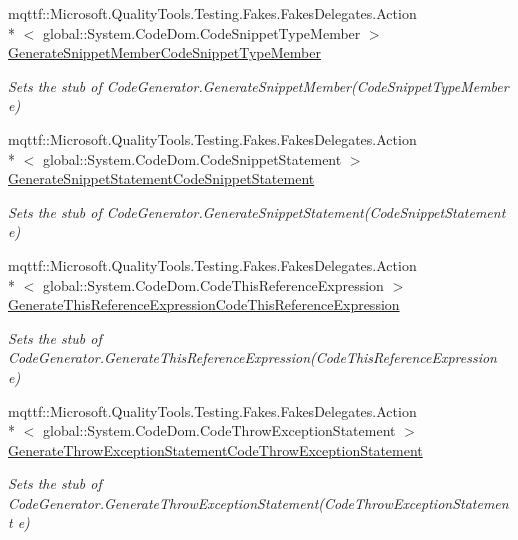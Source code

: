 \begin{DoxyCompactItemize}
mqttf\-::\-Microsoft.\-Quality\-Tools.\-Testing.\-Fakes.\-Fakes\-Delegates.\-Action\\*
$<$ global\-::\-System.\-Code\-Dom.\-Code\-Snippet\-Type\-Member $>$ \hyperlink{class_system_1_1_code_dom_1_1_compiler_1_1_fakes_1_1_stub_code_compiler_ae77212597b5ac56ca1a65abc0ab23741}{Generate\-Snippet\-Member\-Code\-Snippet\-Type\-Member}
\begin{DoxyCompactList}\small\item\em Sets the stub of Code\-Generator.\-Generate\-Snippet\-Member(\-Code\-Snippet\-Type\-Member e)\end{DoxyCompactList}\item 
mqttf\-::\-Microsoft.\-Quality\-Tools.\-Testing.\-Fakes.\-Fakes\-Delegates.\-Action\\*
$<$ global\-::\-System.\-Code\-Dom.\-Code\-Snippet\-Statement $>$ \hyperlink{class_system_1_1_code_dom_1_1_compiler_1_1_fakes_1_1_stub_code_compiler_a4a113cd1a071c3c164f4676dfbf47eeb}{Generate\-Snippet\-Statement\-Code\-Snippet\-Statement}
\begin{DoxyCompactList}\small\item\em Sets the stub of Code\-Generator.\-Generate\-Snippet\-Statement(\-Code\-Snippet\-Statement e)\end{DoxyCompactList}\item 
mqttf\-::\-Microsoft.\-Quality\-Tools.\-Testing.\-Fakes.\-Fakes\-Delegates.\-Action\\*
$<$ global\-::\-System.\-Code\-Dom.\-Code\-This\-Reference\-Expression $>$ \hyperlink{class_system_1_1_code_dom_1_1_compiler_1_1_fakes_1_1_stub_code_compiler_a50e6edc4c36831127bc5a951266b0f07}{Generate\-This\-Reference\-Expression\-Code\-This\-Reference\-Expression}
\begin{DoxyCompactList}\small\item\em Sets the stub of Code\-Generator.\-Generate\-This\-Reference\-Expression(\-Code\-This\-Reference\-Expression e)\end{DoxyCompactList}\item 
mqttf\-::\-Microsoft.\-Quality\-Tools.\-Testing.\-Fakes.\-Fakes\-Delegates.\-Action\\*
$<$ global\-::\-System.\-Code\-Dom.\-Code\-Throw\-Exception\-Statement $>$ \hyperlink{class_system_1_1_code_dom_1_1_compiler_1_1_fakes_1_1_stub_code_compiler_ace690988ec2ac3eb483c613e4b22f603}{Generate\-Throw\-Exception\-Statement\-Code\-Throw\-Exception\-Statement}
\begin{DoxyCompactList}\small\item\em Sets the stub of Code\-Generator.\-Generate\-Throw\-Exception\-Statement(\-Code\-Throw\-Exception\-Statement e)\end{DoxyCompactList}\item 

\end{DoxyCompactItemize}
